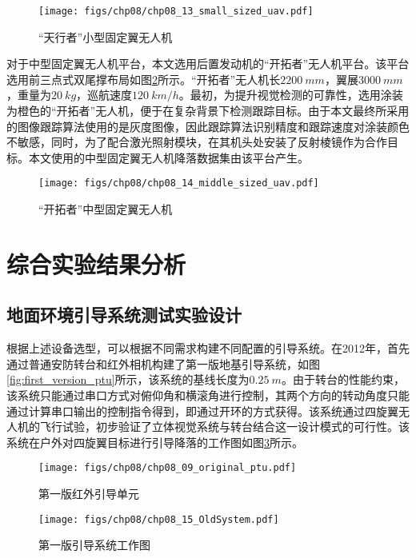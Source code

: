 \begin{figure}[!ht]
	\centering
	\texttt{[image: figs/chp08/chp08\_13\_small\_sized\_uav.pdf]}	
	\caption{“天行者”小型固定翼无人机}
	\label{fig:chp08_13_small_sized_uav}
\end{figure}

对于中型固定翼无人机平台，本文选用后置发动机的“开拓者”无人机平台。该平台选用前三点式双尾撑布局如图\ref{fig:chp08_14_middle_sized_uav}所示。“开拓者”无人机长$2200\ mm$，翼展$3000\ mm$，重量为$20\ kg$，巡航速度$120\ km/h$。最初，为提升视觉检测的可靠性，选用涂装为橙色的“开拓者”无人机，便于在复杂背景下检测跟踪目标。由于本文最终所采用的图像跟踪算法使用的是灰度图像，因此跟踪算法识别精度和跟踪速度对涂装颜色不敏感，同时，为了配合激光照射模块，在其机头处安装了反射棱镜作为合作目标。本文使用的中型固定翼无人机降落数据集由该平台产生。

\begin{figure}[!ht]
	\centering
	\texttt{[image: figs/chp08/chp08\_14\_middle\_sized\_uav.pdf]}	
	\caption{“开拓者”中型固定翼无人机}
	\label{fig:chp08_14_middle_sized_uav}
\end{figure}





\section{综合实验结果分析}
\subsection{地面环境引导系统测试实验设计}
根据上述设备选型，可以根据不同需求构建不同配置的引导系统。在2012年，首先通过普通安防转台和红外相机构建了第一版地基引导系统，如图\ref{fig:first_version_ptu}所示，该系统的基线长度为$0.25\ m$。由于转台的性能约束，该系统只能通过串口方式对俯仰角和横滚角进行控制，其两个方向的转动角度只能通过计算串口输出的控制指令得到，即通过开环的方式获得。该系统通过四旋翼无人机的飞行试验，初步验证了立体视觉系统与转台结合这一设计模式的可行性。该系统在户外对四旋翼目标进行引导降落的工作图如图\ref{fig:first_version_ptu_2}所示。

\begin{figure}[!t]
	\begin{minipage}{0.5\textwidth}
		\centering
		\texttt{[image: figs/chp08/chp08\_09\_original\_ptu.pdf]}	
		\caption{第一版红外引导单元}
		\label{fig:first_version_ptu}
	\end{minipage}\hfill
	\begin{minipage}{0.5\textwidth}
		\centering
		\texttt{[image: figs/chp08/chp08\_15\_OldSystem.pdf]}	
		\caption{第一版引导系统工作图}
		\label{fig:first_version_ptu_2}
	\end{minipage}
\end{figure}

